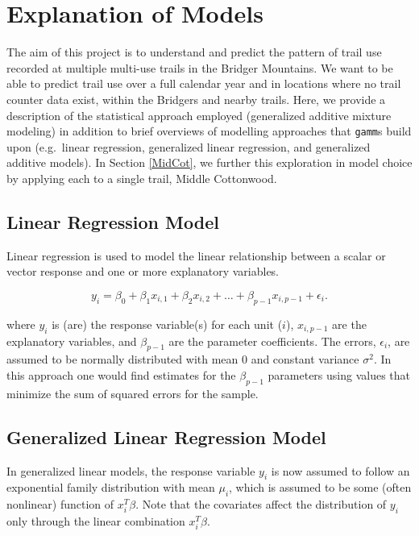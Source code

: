 \documentclass[
]{book}
\begin{document}
\hypertarget{Models}{%
\chapter{Explanation of Models}\label{Models}}

The aim of this project is to understand and predict the pattern of
trail use recorded at multiple multi-use trails in the Bridger
Mountains. We want to be able to predict trail use over a full calendar
year and in locations where no trail counter data exist, within the
Bridgers and nearby trails. Here, we provide a description of the
statistical approach employed (generalized additive mixture modeling) in
addition to brief overviews of modelling approaches that \texttt{gamm}s build
upon (e.g.~linear regression, generalized linear regression, and
generalized additive models). In Section \ref{MidCot}, we further this
exploration in model choice by applying each to a single trail, Middle
Cottonwood.

\hypertarget{linear-regression-model}{%
\section{Linear Regression Model}\label{linear-regression-model}}

Linear regression is used to model the linear relationship between a
scalar or vector response and one or more explanatory variables.

\[ 
 y_{i}=\beta_{0}+\beta_{1}x_{i,1}+\beta_{2}x_{i,2}+\ldots+\beta_{p-1}x_{i,p-1}+\epsilon_{i}. 
\]

where \(y_i\) is (are) the response variable(s) for each unit (\(i\)),
\(x_{i, p-1}\) are the explanatory variables, and \(\beta_{p-1}\) are the
parameter coefficients. The errors, \(\epsilon_i\), are assumed to be
normally distributed with mean 0 and constant variance \(\sigma^2\). In
this approach one would find estimates for the \(\beta_{p-1}\) parameters
using values that minimize the sum of squared errors for the sample.

\hypertarget{generalized-linear-regression-model}{%
\section{Generalized Linear Regression Model}\label{generalized-linear-regression-model}}

In generalized linear models, the response variable \(y_i\) is now assumed
to follow an exponential family distribution with mean \(\mu_i\), which is
assumed to be some (often nonlinear) function of \(x_i^T\beta\). Note that
the covariates affect the distribution of \(y_i\) only through the linear
combination \(x_i^T\beta\).
\end{document}
